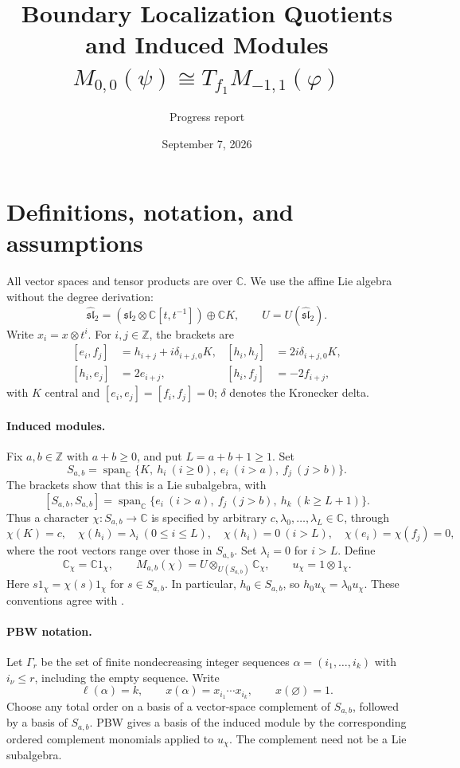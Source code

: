 \documentclass[11pt]{article}
\title{Boundary Localization Quotients and Induced Modules\\
  \large \(M_{0,0}(\psi)\cong T_{f_1}M_{-1,1}(\varphi)\)}
\author{Progress report}
\date{September 7, 2026}
\newcommand{\C}{\mathbb C}
\newcommand{\Z}{\mathbb Z}
\newcommand{\g}{\widehat{\mathfrak{sl}}_2}
\newcommand{\Span}{\operatorname{span}_{\C}}
\begin{document}
\maketitle

\section{Definitions, notation, and assumptions}

All vector spaces and tensor products are over \(\C\). We use the affine Lie
algebra without the degree derivation:
\[
 \g=(\mathfrak{sl}_2\otimes\C[t,t^{-1}])\oplus\C K,\qquad U=U(\g).
\]
Write \(x_i=x\otimes t^i\). For \(i,j\in\Z\), the brackets are
\begin{equation}\label{eq:brackets}
\begin{aligned}
 [e_i,f_j]&=h_{i+j}+i\delta_{i+j,0}K,&
 [h_i,h_j]&=2i\delta_{i+j,0}K,\\
 [h_i,e_j]&=2e_{i+j},&
 [h_i,f_j]&=-2f_{i+j},
\end{aligned}
\end{equation}
with \(K\) central and \([e_i,e_j]=[f_i,f_j]=0\);
\(\delta\) denotes the Kronecker delta.

\paragraph{Induced modules.}
Fix \(a,b\in\Z\) with \(a+b\ge0\), and put \(L=a+b+1\ge1\). Set
\[
 S_{a,b}=\Span\{K,\ h_i\ (i\ge0),\ e_i\ (i>a),\ f_j\ (j>b)\}.
\]
The brackets show that this is a Lie subalgebra, with
\[
 [S_{a,b},S_{a,b}]
 =\Span\{e_i\ (i>a),\ f_j\ (j>b),\ h_k\ (k\ge L+1)\}.
\]
Thus a character \(\chi:S_{a,b}\to\C\) is specified by arbitrary
\(c,\lambda_0,\ldots,\lambda_L\in\C\), through
\[
 \chi(K)=c,\quad \chi(h_i)=\lambda_i\ (0\le i\le L),\quad
 \chi(h_i)=0\ (i>L),\quad \chi(e_i)=\chi(f_j)=0,
\]
where the root vectors range over those in \(S_{a,b}\).
Set \(\lambda_i=0\) for \(i>L\). Define
\[
 \C_\chi=\C 1_\chi,\qquad
 M_{a,b}(\chi)=U\otimes_{U(S_{a,b})}\C_\chi,\qquad u_\chi=1\otimes1_\chi.
\]
Here \(s1_\chi=\chi(s)1_\chi\) for \(s\in S_{a,b}\).
In particular, \(h_0\in S_{a,b}\), so \(h_0u_\chi=\lambda_0u_\chi\).
These conventions agree with \cite[\S2.3]{FGXZ}.

\paragraph{PBW notation.}
Let \(\Gamma_r\) be the set of finite nondecreasing integer sequences
\(\alpha=(i_1,\ldots,i_k)\) with \(i_\nu\le r\), including the empty sequence.
Write
\[
 \ell(\alpha)=k,\qquad x(\alpha)=x_{i_1}\cdots x_{i_k},\qquad
 x(\varnothing)=1.
\]
Choose any total order on a basis of a vector-space complement of \(S_{a,b}\),
followed by a basis of \(S_{a,b}\). PBW gives a basis of the induced module
by the corresponding ordered complement monomials applied to \(u_\chi\).
The complement need not be a Lie subalgebra.
\end{document}
